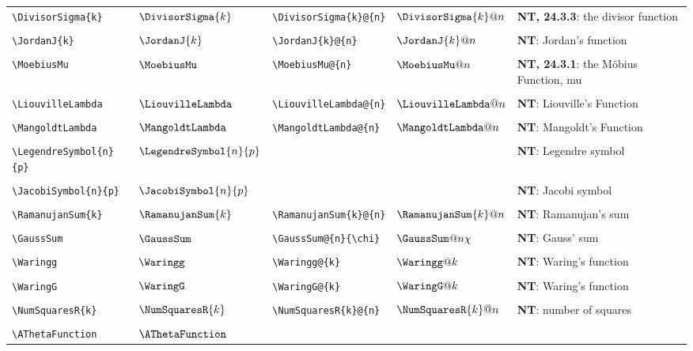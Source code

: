 \begin{supertabular}{ll|ll|p{2in}}
\verb~\DivisorSigma{k}~ & $\DivisorSigma{k}$ & 
\verb~\DivisorSigma{k}@{n}~ & $\DivisorSigma{k}@{n}$ & 
\textbf{NT, 24.3.3}: the divisor function\\*
&&&&\\[-1ex]
\verb~\JordanJ{k}~ & $\JordanJ{k}$ & 
\verb~\JordanJ{k}@{n}~ & $\JordanJ{k}@{n}$ & 
\textbf{NT}: Jordan's function\\*
&&&&\\[-1ex]
\verb~\MoebiusMu~ & $\MoebiusMu$ & 
\verb~\MoebiusMu@{n}~ & $\MoebiusMu@{n}$ & 
\textbf{NT, 24.3.1}: the M\"obius Function, mu\\*
&&&&\\[-1ex]
\verb~\LiouvilleLambda~ & $\LiouvilleLambda$ & 
\verb~\LiouvilleLambda@{n}~ & $\LiouvilleLambda@{n}$ & 
\textbf{NT}: Liouville's Function\\*
&&&&\\[-1ex]
\verb~\MangoldtLambda~ & $\MangoldtLambda$ & 
\verb~\MangoldtLambda@{n}~ & $\MangoldtLambda@{n}$ & 
\textbf{NT}: Mangoldt's Function\\*
&&&&\\[-1ex]
\verb~\LegendreSymbol{n}{p}~ & $\LegendreSymbol{n}{p}$ & 
&&
\textbf{NT}: Legendre symbol\\*
&&&&\\[-1ex]
\verb~\JacobiSymbol{n}{p}~ & $\JacobiSymbol{n}{p}$ & 
&&
\textbf{NT}: Jacobi symbol\\*
&&&&\\[-1ex]
\verb~\RamanujanSum{k}~ & $\RamanujanSum{k}$ & 
\verb~\RamanujanSum{k}@{n}~ & $\RamanujanSum{k}@{n}$ & 
\textbf{NT}: Ramanujan's sum\\*
&&&&\\[-1ex]
\verb~\GaussSum~ & $\GaussSum$ & 
\verb~\GaussSum@{n}{\chi}~ & $\GaussSum@{n}{\chi}$ & 
\textbf{NT}: Gauss' sum\\*
&&&&\\[-1ex]
\verb~\Waringg~ & $\Waringg$ & 
\verb~\Waringg@{k}~ & $\Waringg@{k}$ & 
\textbf{NT}: Waring's function\\*
&&&&\\[-1ex]
\verb~\WaringG~ & $\WaringG$ & 
\verb~\WaringG@{k}~ & $\WaringG@{k}$ & 
\textbf{NT}: Waring's function\\*
&&&&\\[-1ex]
\verb~\NumSquaresR{k}~ & $\NumSquaresR{k}$ & 
\verb~\NumSquaresR{k}@{n}~ & $\NumSquaresR{k}@{n}$ & 
\textbf{NT}: number of squares\\*
&&&&\\[-1ex]
\verb~\AThetaFunction~ & $\AThetaFunction$ & 

\end{supertabular}
